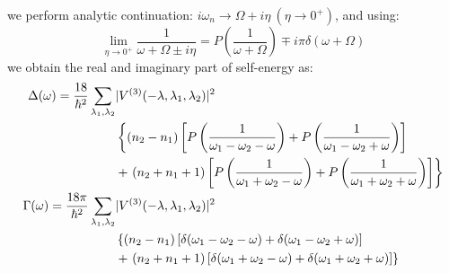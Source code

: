 \documentclass{article}
\begin{document}
we perform analytic continuation: $i\omega_n \to \Omega + i\eta \ (\eta \to 0^+)$, and using:
\begin{equation}
    \lim_{\eta \to 0^+} \frac{1}{\omega+\Omega\pm i\eta} = P(\frac{1}{\omega+\Omega}) \mp i\pi\delta(\omega + \Omega)
\end{equation}
we obtain the real and imaginary part of self-energy as:
\begin{align}
    \Delta(\omega) = \frac{18}{\hbar^2} \sum_{\lambda_1,\lambda_2} & |V^{(3)}(-\lambda,\lambda_1,\lambda_2)|^2 \notag \\
            & \left\{ (n_2-n_1)\left[ P\left(\frac{1}{\omega_1-\omega_2-\omega}\right)  + P\left(\frac{1}{\omega_1-\omega_2+\omega}\right) \right] \right. \notag \\
            &+ \left. (n_2+n_1+1)\left[ P\left(\frac{1}{\omega_1+\omega_2-\omega}\right) + P\left(\frac{1}{\omega_1+\omega_2+\omega}\right) \right] \right\} \\
    \Gamma(\omega) = \frac{18\pi}{\hbar^2} \sum_{\lambda_1,\lambda_2} & |V^{(3)}(-\lambda,\lambda_1,\lambda_2)|^2 \notag \\
            & \left\{ (n_2-n_1)\left[ \delta(\omega_1-\omega_2-\omega)  + \delta(\omega_1-\omega_2+\omega) \right] \right. \notag \\
            &+ \left. (n_2+n_1+1)\left[ \delta(\omega_1+\omega_2-\omega) + \delta(\omega_1+\omega_2+\omega) \right] \right\} 
\end{align}
\end{document}
